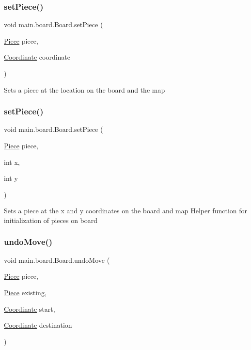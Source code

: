 \subsubsection{\texorpdfstring{set\+Piece()}{setPiece()}\hspace{0.1cm}{\footnotesize\ttfamily [1/2]}}
{\footnotesize\ttfamily void main.\+board.\+Board.\+set\+Piece (\begin{DoxyParamCaption}\item[{\hyperlink{classmain_1_1pieces_1_1_piece}{Piece}}]{piece,  }\item[{\hyperlink{classmain_1_1board_1_1_coordinate}{Coordinate}}]{coordinate }\end{DoxyParamCaption})}

Sets a piece at the location on the board and the map \hypertarget{classmain_1_1board_1_1_board_adddfc2c7018880f34439dce2cb12bc00}{}\label{classmain_1_1board_1_1_board_adddfc2c7018880f34439dce2cb12bc00} 
\subsubsection{\texorpdfstring{set\+Piece()}{setPiece()}\hspace{0.1cm}{\footnotesize\ttfamily [2/2]}}
{\footnotesize\ttfamily void main.\+board.\+Board.\+set\+Piece (\begin{DoxyParamCaption}\item[{\hyperlink{classmain_1_1pieces_1_1_piece}{Piece}}]{piece,  }\item[{int}]{x,  }\item[{int}]{y }\end{DoxyParamCaption})}

Sets a piece at the x and y coordinates on the board and map Helper function for initialization of pieces on board \hypertarget{classmain_1_1board_1_1_board_aa3d88b342a331ba8bb306e77052521a8}{}\label{classmain_1_1board_1_1_board_aa3d88b342a331ba8bb306e77052521a8} 
\subsubsection{\texorpdfstring{undo\+Move()}{undoMove()}}
{\footnotesize\ttfamily void main.\+board.\+Board.\+undo\+Move (\begin{DoxyParamCaption}\item[{\hyperlink{classmain_1_1pieces_1_1_piece}{Piece}}]{piece,  }\item[{\hyperlink{classmain_1_1pieces_1_1_piece}{Piece}}]{existing,  }\item[{\hyperlink{classmain_1_1board_1_1_coordinate}{Coordinate}}]{start,  }\item[{\hyperlink{classmain_1_1board_1_1_coordinate}{Coordinate}}]{destination }\end{DoxyParamCaption})}

